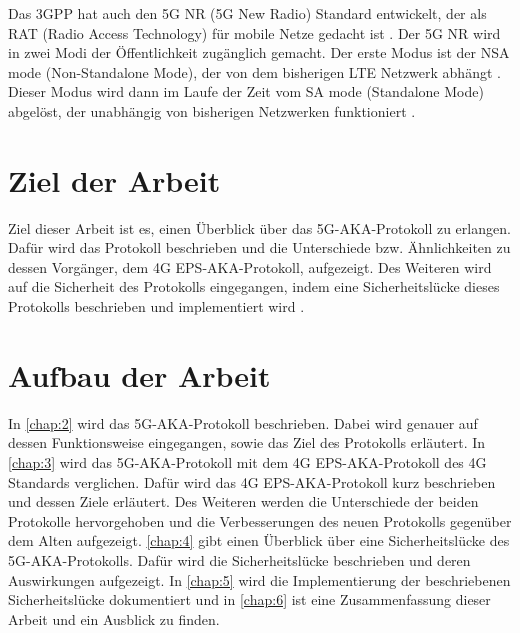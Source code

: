 Das 3GPP hat auch den 5G NR (5G New Radio) Standard entwickelt, der als RAT (Radio Access Technology) für mobile Netze gedacht ist \cite{8258595}.
Der 5G NR wird in zwei Modi der Öffentlichkeit zugänglich gemacht. 
Der erste Modus ist der NSA mode (Non-Standalone Mode), der von dem bisherigen LTE Netzwerk abhängt \cite{sutton20185g}.
Dieser Modus wird dann im Laufe der Zeit vom SA mode (Standalone Mode) abgelöst, der unabhängig von bisherigen Netzwerken funktioniert \cite{brown2017service}.


\section{Ziel der Arbeit}
Ziel dieser Arbeit ist es, einen Überblick über das 5G-AKA-Protokoll zu erlangen. 
Dafür wird das Protokoll beschrieben und die Unterschiede bzw. Ähnlichkeiten zu dessen Vorgänger, dem 4G EPS-AKA-Protokoll, aufgezeigt. 
Des Weiteren wird auf die Sicherheit des Protokolls eingegangen, indem eine Sicherheitslücke dieses Protokolls beschrieben und implementiert wird \cite{vulnerability}.


\section{Aufbau der Arbeit}
In \cref{chap:2} wird das 5G-AKA-Protokoll beschrieben. 
Dabei wird genauer auf dessen Funktionsweise eingegangen, sowie das Ziel des Protokolls erläutert. In \cref{chap:3} wird das 5G-AKA-Protokoll mit dem 4G EPS-AKA-Protokoll des 4G Standards verglichen. 
Dafür wird das 4G EPS-AKA-Protokoll kurz beschrieben und dessen Ziele erläutert. 
Des Weiteren werden die Unterschiede der beiden Protokolle hervorgehoben und die Verbesserungen des neuen Protokolls gegenüber dem Alten aufgezeigt.
\cref{chap:4} gibt einen Überblick über eine Sicherheitslücke des 5G-AKA-Protokolls. 
Dafür wird die Sicherheitslücke beschrieben und deren Auswirkungen aufgezeigt. 
In \cref{chap:5} wird die Implementierung der beschriebenen Sicherheitslücke dokumentiert und in \cref{chap:6} ist eine Zusammenfassung dieser Arbeit und ein Ausblick zu finden.





